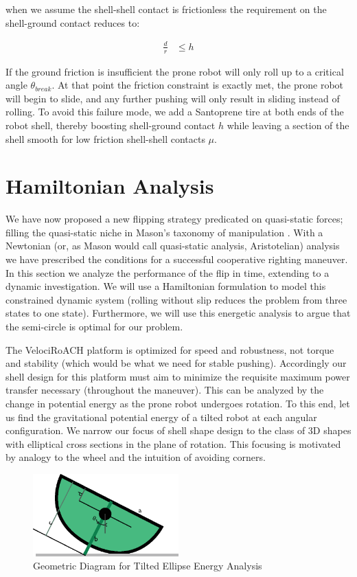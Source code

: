 \documentclass[letterpaper]{report}
\begin{document}
when we assume the shell-shell contact is frictionless the requirement on the shell-ground contact reduces to:

\begin{align}
  \frac{d}{r} &\leq h
\end{align}

If the ground friction is insufficient the prone robot will only roll up to a critical angle $\theta_{break}$.
At that point the friction constraint is exactly met, the prone robot will begin to slide, and any further pushing will only result in sliding instead of rolling.
To avoid this failure mode, we add a Santoprene tire at both ends of the robot shell, thereby boosting shell-ground contact $h$ while leaving a section of the shell smooth for low friction shell-shell contacts $\mu$.

\section{Hamiltonian Analysis}
We have now proposed a new flipping strategy predicated on quasi-static forces; filling the quasi-static niche in Mason's taxonomy of manipulation \cite{MasonMORMBook}.
With a Newtonian (or, as Mason would call quasi-static analysis, Aristotelian) analysis we have prescribed the conditions for a successful cooperative righting maneuver.
In this section we analyze the performance of the flip in time, extending to a dynamic investigation.
We will use a Hamiltonian formulation to model this constrained dynamic system (rolling without slip reduces the problem from three states to one state).
Furthermore, we will use this energetic analysis to argue that the semi-circle is optimal for our problem.

The VelociRoACH platform is optimized for speed and robustness, not torque and stability (which would be what we need for stable pushing).
Accordingly our shell design for this platform must aim to minimize the requisite maximum power transfer necessary (throughout the maneuver).
This can be analyzed by the change in potential energy as the prone robot undergoes rotation.
To this end, let us find the gravitational potential energy of a tilted robot at each angular configuration.
We narrow our focus of shell shape design to the class of 3D shapes with elliptical cross sections in the plane of rotation.
This focusing is motivated by analogy to the wheel and the intuition of avoiding corners.

\begin{figure}[ht]
\centering
\includegraphics[width=0.5\textwidth]{QS_EnergyAnalysis.eps}
\caption{\label{f:QS_energyGeometry}Geometric Diagram for Tilted Ellipse Energy Analysis}
\end{figure}
\end{document}
